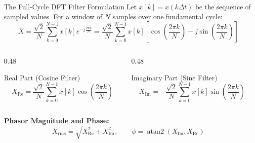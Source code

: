 \begin{frame}[allowframebreaks]{The Full-Cycle DFT Filter Formulation}
    Let $x[k] = x(k \Delta t)$ be the sequence of sampled values.
    For a window of $N$ samples over one fundamental cycle:
    \begin{equation}
        \bar{X} = \frac{\sqrt{2}}{N} \sum_{k=0}^{N-1} x[k] e^{-j \frac{2\pi k}{N}}
        = \frac{\sqrt{2}}{N} \sum_{k=0}^{N-1} x[k] \left[\cos\left(\frac{2\pi k}{N}\right) - j \sin\left(\frac{2\pi k}{N}\right)\right]
    \end{equation}

    \begin{columns}
        \begin{column}{0.48\textwidth}
            \begin{block}{Real Part (Cosine Filter)}
                \begin{equation*}
                    X_{\text{Re}} = \frac{\sqrt{2}}{N} \sum_{k=0}^{N-1} x[k] \cos\left(\frac{2\pi k}{N}\right)
                \end{equation*}
            \end{block}
        \end{column}
        \begin{column}{0.48\textwidth}
            \begin{block}{Imaginary Part (Sine Filter)}
                \begin{equation*}
                    X_{\text{Im}} = -\frac{\sqrt{2}}{N} \sum_{k=0}^{N-1} x[k] \sin\left(\frac{2\pi k}{N}\right)
                \end{equation*}
            \end{block}
        \end{column}
    \end{columns}

    \textbf{Phasor Magnitude and Phase:}
    \begin{equation}
        X_{\text{rms}} = \sqrt{X_{\text{Re}}^2 + X_{\text{Im}}^2}, \qquad \phi = \operatorname{atan2}(X_{\text{Im}}, X_{\text{Re}})
    \end{equation}
\end{frame}

